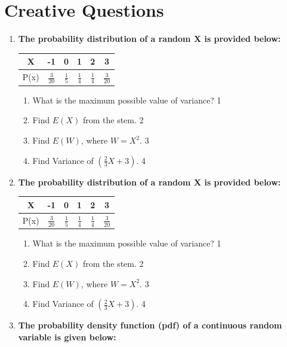 \documentclass[a4paper,oneside, margin=1.4in]{book}
\begin{document}
\section{Creative Questions}
  \begin{enumerate}
  
   \item
	  \textbf{The probability distribution of a random X is provided below:} 
	  
	  \begin{table}[h]
	  \centering
\begin{tabular}{c|ccccc}
X & -1 & 0 & 1 & 2 & 3 \\ \hline
P(x) & $\frac 3{20}$ & $\frac 15$ & $\frac 14$ & $\frac 14$ & $\frac 3{20}$
\end{tabular}
\end{table}
  
  \begin{enumerate}
    \item
	What is the maximum possible value of variance? \hfill 1
    \item
	Find $E(X)$ from the stem. \hfill 2
    \item  
	Find $E(W)$, where $W = X^2$.  \hfill 3
    \item
	Find Variance of $(\frac 23 X+3)$. \hfill 4
  \end{enumerate}    
  \item
	  \textbf{The probability distribution of a random X is provided below:} 
	  
	  \begin{table}[h]
	  \centering
\begin{tabular}{c|ccccc}
X & -1 & 0 & 1 & 2 & 3 \\ \hline
P(x) & $\frac 3{20}$ & $\frac 15$ & $\frac 14$ & $\frac 14$ & $\frac 3{20}$
\end{tabular}
\end{table}
  
  \begin{enumerate}
    \item
	What is the maximum possible value of variance? \hfill 1
    \item
	Find $E(X)$ from the stem. \hfill 2
    \item  
	Find $E(W)$, where $W = X^2$.  \hfill 3
    \item
	Find Variance of $(\frac 23 X+3)$. \hfill 4
  \end{enumerate}   
  
         \item \textbf{The probability density function (pdf) of a continuous random variable is given below:}
	  

\end{enumerate}
\end{document}
